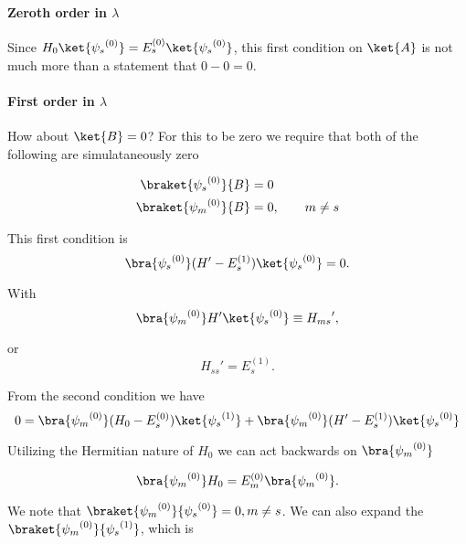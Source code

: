 \paragraph{Zeroth order in $\lambda$}

Since $H_0 \ket{{\psi_s}^{(0)}} = E_s^{(0)} \ket{{\psi_s}^{(0)}}$, this first condition on $\ket{A}$ is not much more than a statement that $0 - 0 = 0$.  

\paragraph{First order in $\lambda$}

How about $\ket{B} = 0$?  For this to be zero we require that both of the following are simulataneously zero

\begin{align}\label{eqn:qmTwoL4:460}
\braket{{\psi_s}^{(0)}}{B} &= 0 \\
\braket{{\psi_m}^{(0)}}{B} &= 0, \qquad m \ne s
\end{align}

This first condition is
\begin{equation}\label{eqn:qmTwoL4:480}
\bra{{\psi_s}^{(0)}} (H' - E_s^{(1)}) \ket{{\psi_s}^{(0)}} = 0.
\end{equation}

With
\begin{equation}\label{eqn:qmTwoL4:500}
\bra{{\psi_m}^{(0)}} H' \ket{{\psi_s}^{(0)}} \equiv {H_{ms}}',
\end{equation}

or
\begin{equation}\label{eqn:qmTwoL4:520}
{H_{ss}}' = E_s^{(1)}.
\end{equation}

From the second condition we have
\begin{equation}\label{eqn:qmTwoL4:540}
0 = \bra{{\psi_m}^{(0)}} 
(H_0 - E_s^{(0)}) \ket{{\psi_s}^{(1)}} 
+\bra{{\psi_m}^{(0)}} 
(H' - E_s^{(1)}) \ket{{\psi_s}^{(0)}} 
\end{equation}

Utilizing the Hermitian nature of $H_0$ we can act backwards on $\bra{{\psi_m}^{(0)}}$ 

\begin{equation}\label{eqn:qmTwoL4:560}
\bra{{\psi_m}^{(0)}} H_0
=
E_m^{(0)} \bra{{\psi_m}^{(0)}}.
\end{equation}

We note that $\braket{{\psi_m}^{(0)}}{{\psi_s}^{(0)}} = 0, m \ne s$.  We can also expand the $\braket{{\psi_m}^{(0)}}{{\psi_s}^{(1)}}$, which is

